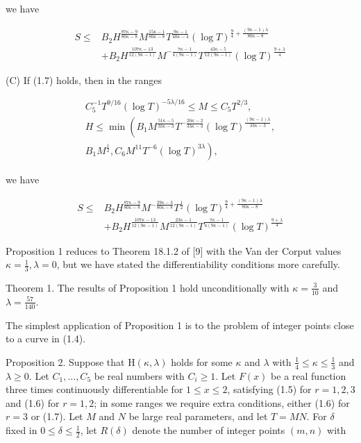 \documentclass[10pt]{article}
\begin{document}
we have

\begin{align*}
S \leqslant & B_{2} H^{\frac{87 \kappa-9}{80 \kappa-8}} M^{\frac{15 \kappa-1}{80 \kappa-8}} T^{\frac{9 \kappa-1}{40 \kappa-4}}(\log T)^{\frac{9}{4}+\frac{(9 \kappa-1) \lambda}{80 \kappa-8}} \\
& +B_{2} H^{\frac{107 \kappa-13}{12(9 \kappa-1)}} M^{-\frac{7 \kappa-1}{4(9 \kappa-1)}} T^{\frac{43 \kappa-5}{12(9 \kappa-1)}}(\log T)^{\frac{9+\lambda}{4}} \tag{1.17}
\end{align*}


(C) If (1.7) holds, then in the ranges


\begin{gather*}
C_{5}^{-1} T^{9 / 16}(\log T)^{-5 \lambda / 16} \leqslant M \leqslant C_{5} T^{2 / 3},  \tag{1.18}\\
H \leqslant \min \left(B_{1} M^{\frac{51 \kappa-5}{33 \kappa-3}} T^{-\frac{20 \kappa-2}{33 \kappa-3}}(\log T)^{\frac{(9 \kappa-1) \lambda}{33 \kappa-3}},\right. \\
\left.B_{1} M^{\frac{1}{2}}, C_{6} M^{11} T^{-6}(\log T)^{3 \lambda}\right), \tag{1.19}
\end{gather*}


we have


\begin{align*}
S \leqslant & B_{2} H^{\frac{87 \kappa-9}{80 \kappa-8}} M^{-\frac{29 \kappa-3}{80 \kappa-8}} T^{\frac{1}{2}}(\log T)^{\frac{9}{4}+\frac{(9 \kappa-1) \lambda}{80 \kappa-8}} \\
& +B_{2} H^{\frac{107 \kappa-13}{12(9 \kappa-1)}} M^{\frac{23 \kappa-1}{12(9 \kappa-1)}} T^{\frac{7 \kappa-1}{4(9 \kappa-1)}}(\log T)^{\frac{9+\lambda}{4}} \tag{1.20}
\end{align*}


Proposition 1 reduces to Theorem 18.1.2 of [9] with the Van der Corput values $\kappa=\frac{1}{3}, \lambda=0$, but we have stated the differentiability conditions more carefully.

Theorem 1. The results of Proposition 1 hold unconditionally with $\kappa=\frac{3}{10}$ and $\lambda=\frac{57}{140}$.

The simplest application of Proposition 1 is to the problem of integer points close to a curve in (1.4).

Proposition 2. Suppose that $\mathrm{H}(\kappa, \lambda)$ holds for some $\kappa$ and $\lambda$ with $\frac{1}{4} \leqslant \kappa \leqslant \frac{1}{3}$ and $\lambda \geqslant 0$. Let $C_{1}, \ldots, C_{5}$ be real numbers with $C_{i} \geqslant 1$. Let $F(x)$ be a real function three times continuously differentiable for $1 \leqslant x \leqslant 2$, satisfying (1.5) for $r=1,2,3$ and (1.6) for $r=1,2$; in some ranges we require extra conditions, either (1.6) for $r=3$ or (1.7). Let $M$ and $N$ be large real parameters, and let $T=M N$. For $\delta$ fixed in $0 \leqslant \delta \leqslant \frac{1}{2}$, let $R(\delta)$ denote the number of integer points $(m, n)$ with
\end{document}
